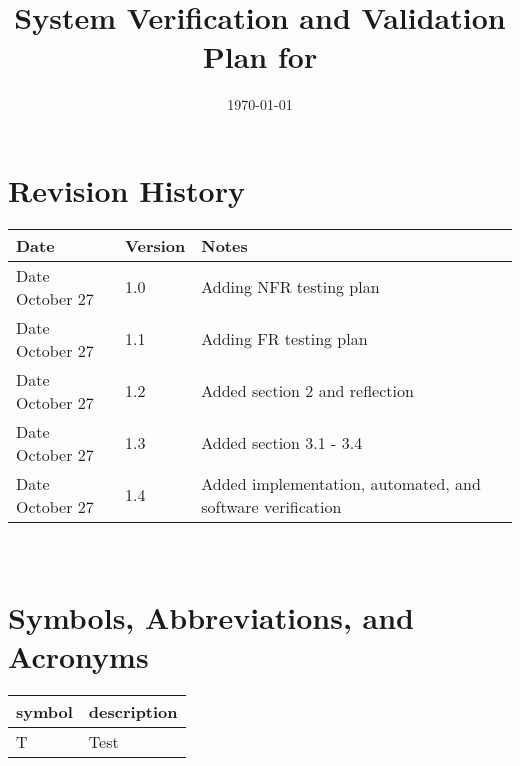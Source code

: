 \documentclass[12pt, titlepage]{article}
\begin{document}
\title{System Verification and Validation Plan for \progname{}} 
\author{\authname}
\date{\today}
	
\maketitle


\section*{Revision History}

\begin{tabularx}{\textwidth}{p{3cm}p{2cm}X}
\toprule {\bf Date} & {\bf Version} & {\bf Notes}\\
\midrule
Date October 27 & 1.0 & Adding NFR testing plan\\
Date October 27 & 1.1 & Adding FR testing plan\\
Date October 27 & 1.2 & Added section 2 and reflection\\
Date October 27 & 1.3 & Added section 3.1 - 3.4\\
Date October 27 & 1.4 & Added implementation, automated, and software verification\\
\bottomrule
\end{tabularx}

~\\


\newpage

\tableofcontents

\listoftables
{}

\listoffigures
{}

\newpage

\section{Symbols, Abbreviations, and Acronyms}

\renewcommand{\arraystretch}{1.2}
\begin{tabular}{l l} 
  \toprule		
  \textbf{symbol} & \textbf{description}\\
  \midrule 
  T & Test\\
  \bottomrule
\end{tabular}\\

\end{document}
